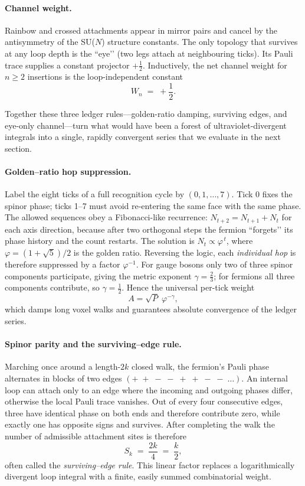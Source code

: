 \documentclass[11pt]{article}
\begin{document}
\paragraph{Channel weight.}
Rainbow and crossed attachments appear in mirror pairs and cancel by the
antisymmetry of the SU($N$) structure constants.  The only topology that
survives at any loop depth is the ``eye’’ (two legs attach at
neighbouring ticks).  Its Pauli trace supplies a constant projector
$+\frac12$.  Inductively, the net channel weight for $n\ge 2$
insertions is the loop-independent constant
\[
  W_{n} \;=\;+\frac12.
\]

Together these three ledger rules—golden-ratio damping, surviving
edges, and eye-only channel—turn what would have been a forest of
ultraviolet-divergent integrals into a single, rapidly convergent series
that we evaluate in the next section.

\paragraph{Golden--ratio hop suppression.}
Label the eight ticks of a full recognition cycle by
$(0,1,\dots,7)$.  Tick $0$ fixes the spinor phase; ticks 1–7 must avoid
re-entering the same face with the same phase.  The allowed sequences
obey a Fibonacci-like recurrence:
\(N_{t+2}=N_{t+1}+N_{t}\) for each axis direction, because after two
orthogonal steps the fermion “forgets’’ its phase history and the count
restarts.  The solution is
\(N_{t}\propto \varphi^{\,t}\), where
\(\varphi=(1+\sqrt5)\!/2\) is the golden ratio.  Reversing the logic,
each \emph{individual hop} is therefore suppressed by a factor
\(\varphi^{-1}\).  For gauge bosons only two of three spinor components
participate, giving the metric exponent \(\gamma=\tfrac23\); for
fermions all three components contribute, so \(\gamma=\tfrac12\).
Hence the universal per-tick weight
\[
  A = \sqrt{P}\;\varphi^{-\gamma},
\]
which damps long voxel walks and guarantees absolute convergence of the
ledger series.

\paragraph{Spinor parity and the surviving–edge rule.}
Marching once around a length-$2k$ closed walk, the fermion’s Pauli
phase alternates in blocks of two edges
\((+\;+\;-\;-\;+\;+\;-\;-\;\ldots)\).  An internal loop can attach only
to an edge where the incoming and outgoing phases differ, otherwise the
local Pauli trace vanishes.  Out of every four consecutive edges, three
have identical phase on both ends and therefore contribute zero, while
exactly one has opposite signs and survives.  After completing the walk
the number of admissible attachment sites is therefore
\[
   S_{k}\;=\;\frac{2k}{4}
   \;=\;\frac{k}{2},
\]
often called the \emph{surviving–edge rule}.  This linear factor
replaces a logarithmically divergent loop integral with a finite, easily
summed combinatorial weight.
\end{document}
